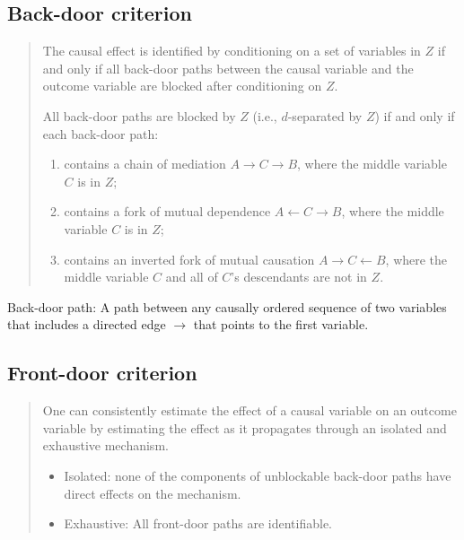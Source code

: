 \documentclass[
]{ctexart}
\providecommand{\tightlist}{%
  \setlength{\itemsep}{0pt}\setlength{\parskip}{0pt}}
\newcommand{\0}{\textbf 0}
\newcommand{\1}{\textbf 1}
\begin{document}
\hypertarget{back-door-criterion}{%
\subsection{Back-door criterion}\label{back-door-criterion}}

\begin{quote}
The causal effect is identified by conditioning on a set of variables in
\(Z\) if and only if all back-door paths between the causal variable and
the outcome variable are blocked after conditioning on \(Z\).

All back-door paths are blocked by \(Z\) (i.e., \(d\)-separated by
\(Z\)) if and only if each back-door path:

\begin{enumerate}
\def\labelenumi{\arabic{enumi}.}
\tightlist
\item
  contains a chain of mediation \(A\to C\to B\), where the middle
  variable \(C\) is in \(Z\);
\item
  contains a fork of mutual dependence \(A\leftarrow C\to B\), where the
  middle variable \(C\) is in \(Z\);
\item
  contains an inverted fork of mutual causation \(A\to C\leftarrow B\),
  where the middle variable \(C\) and all of \(C\)'s descendants are not
  in \(Z\).
\end{enumerate}
\end{quote}

Back-door path: A path between any causally ordered sequence of two
variables that includes a directed edge \(\to\) that points to the first
variable.

\hypertarget{front-door-criterion}{%
\subsection{Front-door criterion}\label{front-door-criterion}}

\begin{quote}
One can consistently estimate the effect of a causal variable on an
outcome variable by estimating the effect as it propagates through an
isolated and exhaustive mechanism.

\begin{itemize}
\tightlist
\item
  Isolated: none of the components of unblockable back-door paths have
  direct effects on the mechanism.
\item
  Exhaustive: All front-door paths are identifiable.
\end{itemize}
\end{quote}
\end{document}
